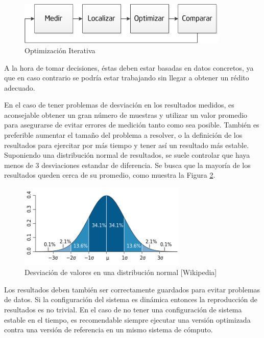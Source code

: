\documentclass[a4paper]{report}
\begin{document}
\begin{figure}[H]
\begin{center}
\includegraphics[width=10cm]{cycle.png}
\caption{Optimización Iterativa}
\label{fig:cycle}
\end{center}
\end{figure}

A la hora de tomar decisiones, éstas deben estar basadas en datos concretos, ya que en caso contrario se podría estar trabajando sin llegar a obtener un rédito adecuado.

\bigskip

En el caso de tener problemas de desviación en los resultados medidos, es aconsejable obtener un gran número de muestras y utilizar un valor promedio para asegurarse de evitar errores de medición tanto como sea posible. También es preferible aumentar el tamaño del problema a resolver, o la definición de los resultados para ejercitar por más tiempo y tener así un resultado más estable.
Suponiendo una distribución normal de resultados, se suele controlar que haya menos de 3 desviaciones estandar de diferencia. Se busca que la mayoría de los resultados queden cerca de su promedio, como muestra la Figura \ref{fig:deviation}.

\begin{figure}[H]
\centering
\includegraphics[width=8cm]{deviation.png}
\caption{Desviación de valores en una distribución normal [Wikipedia]}
\label{fig:deviation}
\end{figure}

Los resultados deben también ser correctamente guardados para evitar
problemas de datos. Si la configuración del sistema es dinámica entonces la
reproducción de resultados es no trivial. En el caso de no tener una
configuración de sistema estable en el tiempo, es recomendable siempre
ejecutar una versión optimizada contra una versión de referencia en un mismo
sistema de cómputo.
\end{document}
